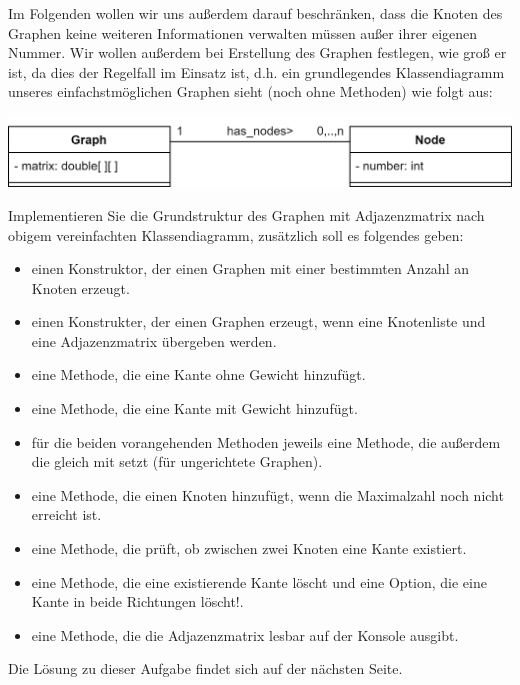 \documentclass{article}
\begin{document}
Im Folgenden wollen wir uns außerdem darauf beschränken, dass die Knoten des Graphen keine weiteren Informationen verwalten müssen außer ihrer eigenen Nummer. Wir wollen außerdem bei Erstellung des Graphen festlegen, wie groß er ist, da dies der Regelfall im Einsatz ist, d.h. ein grundlegendes Klassendiagramm unseres einfachstmöglichen Graphen sieht (noch ohne Methoden) wie folgt aus: 
\begin{center}
    \includegraphics[scale=0.2]{../../media/graph_basic.png}
\end{center}
\begin{task}{1}
Implementieren Sie die Grundstruktur des Graphen mit Adjazenzmatrix nach obigem vereinfachten Klassendiagramm, zusätzlich soll es folgendes geben: 
\begin{itemize}
    \item einen Konstruktor, der einen Graphen mit einer bestimmten Anzahl an Knoten erzeugt. 
    \item einen Konstrukter, der einen Graphen erzeugt, wenn eine Knotenliste und eine Adjazenzmatrix übergeben werden.
    \item eine Methode, die eine Kante ohne Gewicht hinzufügt.
    \item eine Methode, die eine Kante mit Gewicht hinzufügt.
    \item für die beiden vorangehenden Methoden jeweils eine Methode, die außerdem die  gleich mit setzt (für ungerichtete Graphen).
    \item eine Methode, die einen Knoten hinzufügt, wenn die Maximalzahl noch nicht erreicht ist.
    \item eine Methode, die prüft, ob zwischen zwei Knoten eine Kante existiert.
    \item eine Methode, die eine existierende Kante löscht und eine Option, die eine Kante in beide Richtungen löscht!.
    \item eine Methode, die die Adjazenzmatrix lesbar auf der Konsole ausgibt. 
\end{itemize}
\end{task}
Die Lösung zu dieser Aufgabe findet sich auf der nächsten Seite.


\newpage
\end{document}
